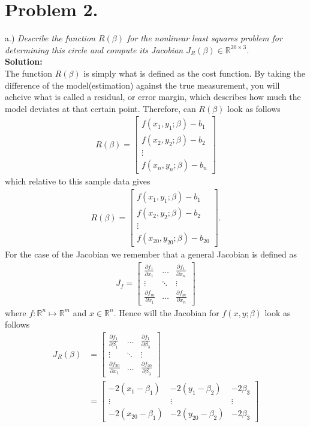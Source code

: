 \documentclass[12pt,
               a4paper,
               article,
               oneside,
               english,oldfontcommands]{memoir}
\newcommand{\R}{\mathbb{R}}
\newcommand{\spaze}{\vspace{4mm}\\}
\begin{document}
\section*{\centering Problem 2.}
a.) \emph{Describe the function $R(\beta)$ for the nonlinear least
squares problem for determining this circle and compute its Jacobian $J_{R}(\beta) \in \R^{20 \times 3}$.} \spaze
\textbf{Solution:}\spaze
The function $R(\beta)$ is simply what is defined as the cost function. By taking the difference of the model(estimation) against the true measurement, you will acheive what is called a residual, or error margin, which describes how much the model deviates at that certain point. Therefore, can $R(\beta)$ look as follows 
\begin{align*}
R(\beta)=  \begin{bmatrix}
f(x_1, y_1; \beta) - b_1 \\[5pt] 
f(x_2, y_2; \beta) - b_2 \\[5pt]
\vdots \\[5pt]
f(x_n, y_n; \beta) - b_n
\end{bmatrix}
\end{align*}
which relative to this sample data gives 
\begin{align*}
R(\beta)=  \begin{bmatrix}
f(x_1, y_1; \beta) - b_1 \\[5pt] 
f(x_2, y_2; \beta) - b_2 \\[5pt]
\vdots \\[5pt]
f(x_{20}, y_{20}; \beta) - b_{20}
\end{bmatrix}.
\end{align*}
For the case of the Jacobian we remember that a general Jacobian is defined as 
\begin{align*}
J_{f} = \begin{bmatrix}
\frac{\partial f_1}{\partial x_1} &\ldots &\frac{\partial f_1}{\partial x_n} \\[5pt]
\vdots &\ddots & \vdots \\[5pt]
\frac{\partial f_m}{\partial x_1} &\ldots &\frac{\partial f_m}{\partial x_n} 
\end{bmatrix}
\end{align*}
where $f: \R^{n} \mapsto \R^{m}$ and $x \in \R^{n}$. Hence will the Jacobian for $f(x,y; \beta)$ look as follows 
\begin{align*}
J_{R}(\beta) &= \begin{bmatrix}
\frac{\partial f_1}{\partial \beta_1} &\ldots &\frac{\partial f_1}{\partial \beta_3} \\[5pt]
\vdots &\ddots & \vdots \\[5pt]
\frac{\partial f_{20}}{\partial x_1} &\ldots &\frac{\partial f_{20}}{\partial \beta_3} 
\end{bmatrix} \\[10pt]
&= \begin{bmatrix}
-2(x_1 - \beta_1) & -2(y_1 - \beta_2)& -2\beta_3\\[5pt]
\vdots & \vdots & \vdots\\[5pt]
 -2(x_{20} - \beta_1) &  -2(y_{20} - \beta_2) & -2\beta_3
\end{bmatrix} \\
\end{align*}
\end{document}
